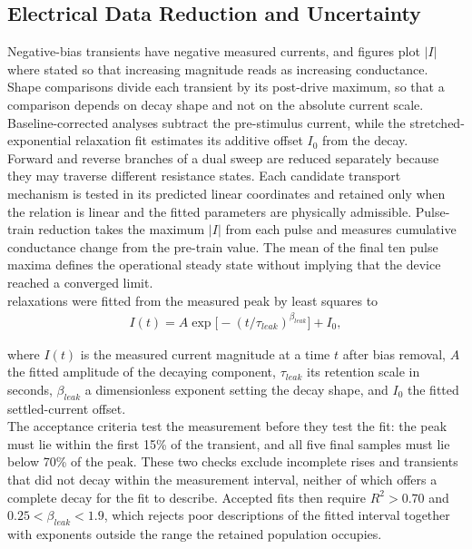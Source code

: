 \subsection[Electrical Data Reduction and Uncertainty]{Electrical Data Reduction and Uncertainty}
\label{sec:3analysis}

\noindent Negative-bias transients have negative measured currents, and figures plot $|I|$ where stated so that
increasing magnitude reads as increasing conductance. Shape comparisons divide each transient by its post-drive
maximum, so that a comparison depends on decay shape and not on the absolute current scale. Baseline-corrected
analyses subtract the pre-stimulus current, while the stretched-exponential relaxation fit estimates its additive
offset $I_0$ from the decay.\\

\noindent Forward and reverse branches of a dual sweep are reduced separately because they may traverse different
resistance states. Each candidate transport mechanism is tested in its predicted linear coordinates and retained only
when the relation is linear and the fitted parameters are physically admissible. Pulse-train reduction takes the
maximum $|I|$ from each pulse and measures cumulative conductance change
from the pre-train value. The mean of the final ten pulse maxima defines the operational steady state without implying
that the device reached a converged limit.\\

\noindent {} relaxations were fitted from the measured peak by least squares to
\begin{align}
    I(t) = A\exp\!\big[-(t/\tau_{leak})^{\beta_{leak}}\big] + I_0, \label{eq:3.1}
\end{align}

\noindent where $I(t)$ is the measured current magnitude at a time $t$ after bias removal, $A$ the fitted
amplitude of the decaying component, $\tau_{leak}$ its retention scale in seconds, $\beta_{leak}$ a dimensionless
exponent setting the decay shape, and $I_0$ the fitted settled-current offset.\\

\noindent The acceptance criteria test the measurement before they test the fit: the peak must lie within the first
15\% of the transient, and all five final samples must lie below 70\% of the peak. These two checks exclude
incomplete rises and transients that did not decay within the measurement interval, neither of which offers a
complete decay for the fit to describe. Accepted fits then require $R^2>0.70$ and
$0.25<\beta_{leak}<1.9$, which rejects poor descriptions of the fitted interval together with exponents outside the
range the retained population occupies.\\

